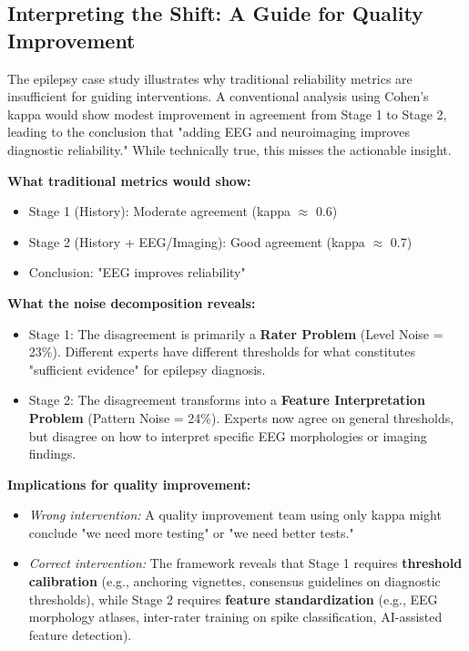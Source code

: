 \documentclass[num-refs]{wiley-article}
\begin{document}
\subsection*{Interpreting the Shift: A Guide for Quality Improvement}

The epilepsy case study illustrates why traditional reliability metrics are insufficient for guiding interventions. A conventional analysis using Cohen's kappa would show modest improvement in agreement from Stage 1 to Stage 2, leading to the conclusion that "adding EEG and neuroimaging improves diagnostic reliability." While technically true, this misses the actionable insight.

\textbf{What traditional metrics would show:}
\begin{itemize}
    \item Stage 1 (History): Moderate agreement (kappa $\approx$ 0.6)
    \item Stage 2 (History + EEG/Imaging): Good agreement (kappa $\approx$ 0.7)
    \item Conclusion: "EEG improves reliability"
\end{itemize}

\textbf{What the noise decomposition reveals:}
\begin{itemize}
    \item Stage 1: The disagreement is primarily a \textbf{Rater Problem} (Level Noise = 23\%). Different experts have different thresholds for what constitutes "sufficient evidence" for epilepsy diagnosis.
    \item Stage 2: The disagreement transforms into a \textbf{Feature Interpretation Problem} (Pattern Noise = 24\%). Experts now agree on general thresholds, but disagree on how to interpret specific EEG morphologies or imaging findings.
\end{itemize}

\textbf{Implications for quality improvement:}
\begin{itemize}
    \item \textit{Wrong intervention:} A quality improvement team using only kappa might conclude "we need more testing" or "we need better tests."
    \item \textit{Correct intervention:} The framework reveals that Stage 1 requires \textbf{threshold calibration} (e.g., anchoring vignettes, consensus guidelines on diagnostic thresholds), while Stage 2 requires \textbf{feature standardization} (e.g., EEG morphology atlases, inter-rater training on spike classification, AI-assisted feature detection).
\end{itemize}
\end{document}
